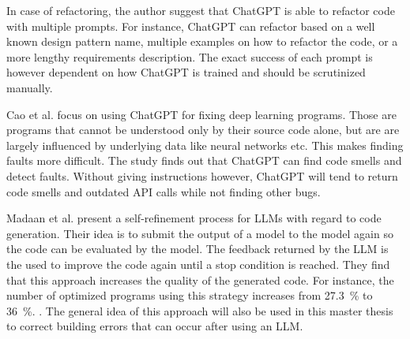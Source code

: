 In case of refactoring, the author suggest that ChatGPT is able to refactor code with multiple prompts. For instance, ChatGPT can refactor based on a well known design pattern name, multiple examples on how to refactor the code, or a more lengthy requirements description. The exact success of each prompt is however dependent on how ChatGPT is trained and should be scrutinized manually. 

Cao et al. \cite{cao2023study} focus on using ChatGPT for fixing deep learning programs. Those are programs that cannot be understood only by their source code alone, but are are largely influenced by underlying data like  neural networks etc. This makes finding faults more difficult. The study finds out that ChatGPT can find code smells and detect faults. Without giving instructions however, ChatGPT will tend to return code smells and outdated API calls while not finding other bugs. 


Madaan et al. present a self-refinement process for \acp{LLM} with regard to code generation. Their idea is to submit the output of a model to the model again so the code can be evaluated by the model. The feedback returned by the \ac{LLM} is the used to improve the code again until a stop condition is reached. They find that this approach increases the quality of the generated code. For instance, the number of optimized programs using this strategy increases from 27.3~\% to 36~\%. \cite{Madaan2023SelfRefineIR}. 
The general idea of this approach will also be used in this master thesis to correct building errors that can occur after using an \ac{LLM}. 
